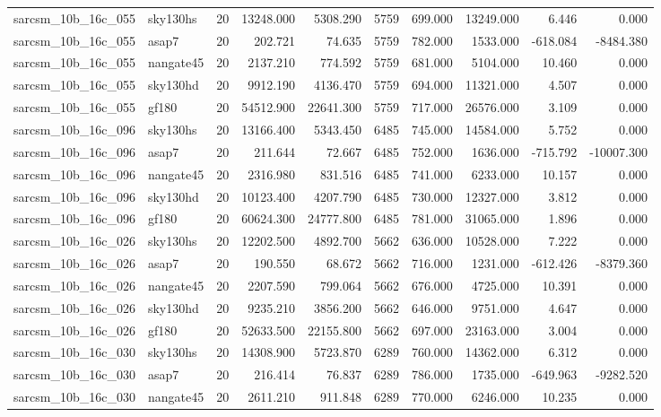 \begin{longtable}{llrrrrrrrr}
sarcsm\_10b\_16c\_055 & sky130hs & 20 & 13248.000 & 5308.290 & 5759 & 699.000 & 13249.000 & 6.446 & 0.000 \\
sarcsm\_10b\_16c\_055 & asap7 & 20 & 202.721 & 74.635 & 5759 & 782.000 & 1533.000 & -618.084 & -8484.380 \\
sarcsm\_10b\_16c\_055 & nangate45 & 20 & 2137.210 & 774.592 & 5759 & 681.000 & 5104.000 & 10.460 & 0.000 \\
sarcsm\_10b\_16c\_055 & sky130hd & 20 & 9912.190 & 4136.470 & 5759 & 694.000 & 11321.000 & 4.507 & 0.000 \\
sarcsm\_10b\_16c\_055 & gf180 & 20 & 54512.900 & 22641.300 & 5759 & 717.000 & 26576.000 & 3.109 & 0.000 \\
sarcsm\_10b\_16c\_096 & sky130hs & 20 & 13166.400 & 5343.450 & 6485 & 745.000 & 14584.000 & 5.752 & 0.000 \\
sarcsm\_10b\_16c\_096 & asap7 & 20 & 211.644 & 72.667 & 6485 & 752.000 & 1636.000 & -715.792 & -10007.300 \\
sarcsm\_10b\_16c\_096 & nangate45 & 20 & 2316.980 & 831.516 & 6485 & 741.000 & 6233.000 & 10.157 & 0.000 \\
sarcsm\_10b\_16c\_096 & sky130hd & 20 & 10123.400 & 4207.790 & 6485 & 730.000 & 12327.000 & 3.812 & 0.000 \\
sarcsm\_10b\_16c\_096 & gf180 & 20 & 60624.300 & 24777.800 & 6485 & 781.000 & 31065.000 & 1.896 & 0.000 \\
sarcsm\_10b\_16c\_026 & sky130hs & 20 & 12202.500 & 4892.700 & 5662 & 636.000 & 10528.000 & 7.222 & 0.000 \\
sarcsm\_10b\_16c\_026 & asap7 & 20 & 190.550 & 68.672 & 5662 & 716.000 & 1231.000 & -612.426 & -8379.360 \\
sarcsm\_10b\_16c\_026 & nangate45 & 20 & 2207.590 & 799.064 & 5662 & 676.000 & 4725.000 & 10.391 & 0.000 \\
sarcsm\_10b\_16c\_026 & sky130hd & 20 & 9235.210 & 3856.200 & 5662 & 646.000 & 9751.000 & 4.647 & 0.000 \\
sarcsm\_10b\_16c\_026 & gf180 & 20 & 52633.500 & 22155.800 & 5662 & 697.000 & 23163.000 & 3.004 & 0.000 \\
sarcsm\_10b\_16c\_030 & sky130hs & 20 & 14308.900 & 5723.870 & 6289 & 760.000 & 14362.000 & 6.312 & 0.000 \\
sarcsm\_10b\_16c\_030 & asap7 & 20 & 216.414 & 76.837 & 6289 & 786.000 & 1735.000 & -649.963 & -9282.520 \\
sarcsm\_10b\_16c\_030 & nangate45 & 20 & 2611.210 & 911.848 & 6289 & 770.000 & 6246.000 & 10.235 & 0.000 \\

\end{longtable}
